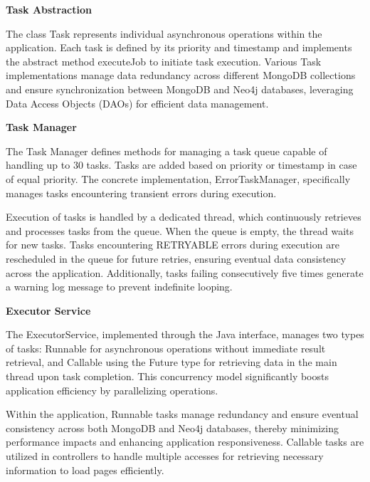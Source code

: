 \textbf{Task Abstraction}

The class Task represents individual asynchronous operations within the application. Each task is defined by its priority and timestamp 
and implements the abstract method executeJob to initiate task execution. Various Task implementations manage data redundancy across different 
MongoDB collections and ensure synchronization between MongoDB and Neo4j databases, leveraging Data Access Objects (DAOs) for efficient data management.

\vspace{\baselineskip}

\textbf{Task Manager}

The Task Manager defines methods for managing a task queue capable of handling up to 30 tasks. Tasks are added based on priority 
or timestamp in case of equal priority. The concrete implementation, ErrorTaskManager, specifically manages tasks encountering transient errors during execution.

\vspace{\baselineskip}

Execution of tasks is handled by a dedicated thread, which continuously retrieves and processes tasks from the queue. When the queue is empty, the 
thread waits for new tasks. Tasks encountering RETRYABLE errors during execution are rescheduled in the queue for future retries, ensuring eventual
data consistency across the application. Additionally, tasks failing consecutively five times generate a warning log message to prevent indefinite looping.

\vspace{\baselineskip}

\textbf{Executor Service}

The ExecutorService, implemented through the Java interface, manages two types of tasks: Runnable for asynchronous operations 
without immediate result retrieval, and Callable using the Future type for retrieving data in the main thread upon task completion. 
This concurrency model significantly boosts application efficiency by parallelizing operations.

\vspace{\baselineskip}

Within the application, Runnable tasks manage redundancy and ensure eventual consistency across both MongoDB and 
Neo4j databases, thereby minimizing performance impacts and enhancing application responsiveness. Callable tasks 
are utilized in controllers to handle multiple accesses for retrieving necessary information to load pages efficiently.

